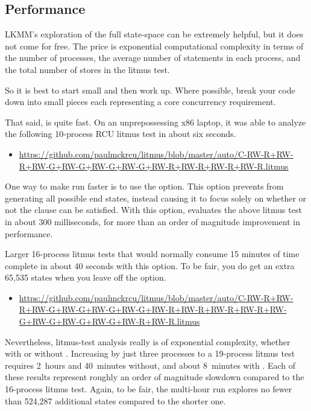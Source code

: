 \subsection{Performance}

LKMM's exploration of the full state-space can be extremely helpful,
but it does not come for free.
The price is exponential computational complexity in terms of the number
of processes, the average number of statements in each process, and the
total number of stores in the litmus test.

So it is best to start small and then work up.
Where possible, break your code down into small pieces each representing
a core concurrency requirement.

That said,  is quite fast.
On an unprepossessing x86 laptop, it was able to analyze the following
10-process RCU litmus test in about six seconds.

\begin{itemize}
\item \url{https://github.com/paulmckrcu/litmus/blob/master/auto/C-RW-R+RW-R+RW-G+RW-G+RW-G+RW-G+RW-R+RW-R+RW-R+RW-R.litmus}
\end{itemize}

One way to make  run faster is to use the 
option.
This option prevents  from generating all possible end states,
instead causing it to focus solely on whether or not the 
clause can be satisfied.
With this option,  evaluates the above litmus test in
about 300 milliseconds, for more than an order of magnitude improvement
in performance.

Larger 16-process litmus tests that would normally consume 15 minutes
of time complete in about 40 seconds with this option.
To be fair, you do get an extra 65,535 states when you leave off the
 option.

\begin{itemize}
\item \url{https://github.com/paulmckrcu/litmus/blob/master/auto/C-RW-R+RW-R+RW-G+RW-G+RW-G+RW-G+RW-R+RW-R+RW-R+RW-R+RW-G+RW-G+RW-G+RW-G+RW-R+RW-R.litmus}
\end{itemize}
    
Nevertheless, litmus-test analysis really is of exponential complexity,
whether with or without .
Increasing by just three processes to a 19-process litmus test requires
2~hours and 40~minutes without, and about 8~minutes with .
Each of these results represent roughly an order of magnitude slowdown
compared to the 16-process litmus test.
Again, to be fair, the multi-hour run explores no fewer than 524,287
additional states compared to the shorter one.

